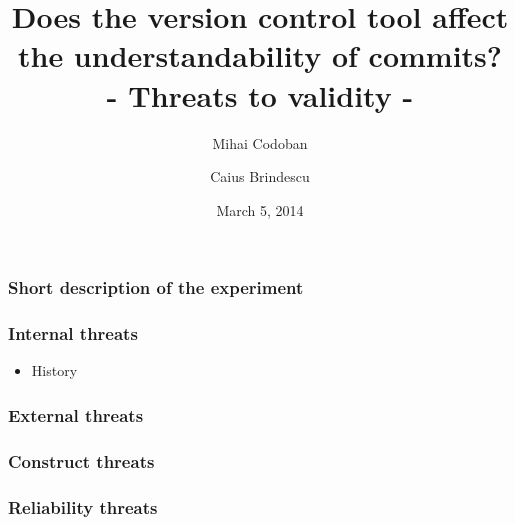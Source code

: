 \documentclass{beamer}
\title{Does the version control tool affect the understandability of commits? \\ - Threats to validity - }
\author{Mihai Codoban \and Caius Brindescu}
\date{March 5, 2014}
\begin{document}
\begin{frame}
\titlepage
\end{frame}

\begin{frame}
\frametitle{Short description of the experiment}

\end{frame}

\begin{frame}
\end{frame}

\begin{frame}
\frametitle{Internal threats}
\begin{itemize}
	\item History
\end{itemize}
\end{frame}

\begin{frame}
\frametitle{External threats}
\end{frame}

\begin{frame}
\frametitle{Construct threats}
\end{frame}

\begin{frame}
\frametitle{Reliability threats}
\end{frame}
\end{document}
